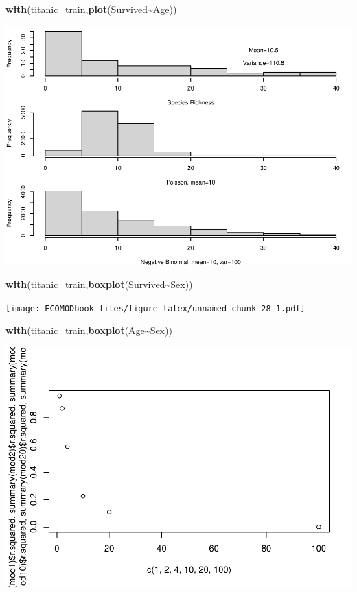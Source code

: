\documentclass[
]{book}
\newenvironment{Shaded}{\begin{snugshade}}{\end{snugshade}}
\newcommand{\FunctionTok}[1]{\textcolor[rgb]{0.13,0.29,0.53}{\textbf{#1}}}
\newcommand{\NormalTok}[1]{#1}
\newcommand{\SpecialCharTok}[1]{\textcolor[rgb]{0.81,0.36,0.00}{\textbf{#1}}}
\begin{document}
\begin{Shaded}
\begin{Highlighting}[]
\FunctionTok{with}\NormalTok{(titanic\_train,}\FunctionTok{plot}\NormalTok{(Survived}\SpecialCharTok{\textasciitilde{}}\NormalTok{Age))}
\end{Highlighting}
\end{Shaded}

\includegraphics{ECOMODbook_files/figure-latex/unnamed-chunk-27-1.pdf}

\begin{Shaded}
\begin{Highlighting}[]
\FunctionTok{with}\NormalTok{(titanic\_train,}\FunctionTok{boxplot}\NormalTok{(Survived}\SpecialCharTok{\textasciitilde{}}\NormalTok{Sex))}
\end{Highlighting}
\end{Shaded}

\texttt{[image: ECOMODbook\_files/figure-latex/unnamed-chunk-28-1.pdf]}

\begin{Shaded}
\begin{Highlighting}[]
\FunctionTok{with}\NormalTok{(titanic\_train,}\FunctionTok{boxplot}\NormalTok{(Age}\SpecialCharTok{\textasciitilde{}}\NormalTok{Sex))}
\end{Highlighting}
\end{Shaded}

\includegraphics{ECOMODbook_files/figure-latex/unnamed-chunk-29-1.pdf}
\end{document}
